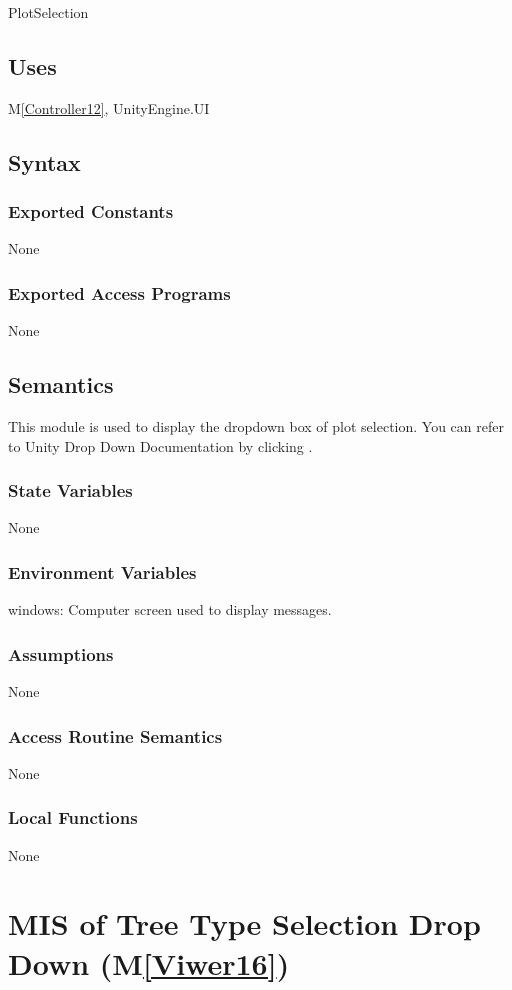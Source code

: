 \documentclass[12pt, titlepage]{article}
\newcommand{\mref}[1]{M\ref{#1}}
\begin{document}
PlotSelection

\subsection{Uses}

\mref{Controller12}, UnityEngine.UI

\subsection{Syntax}

\subsubsection{Exported Constants}
None
\subsubsection{Exported Access Programs}
None

\subsection{Semantics}
This module is used to display the dropdown box of plot 
selection. You can refer to Unity Drop Down Documentation 
by clicking \dref.
\subsubsection{State Variables}
None
\subsubsection{Environment Variables}
windows: Computer screen used to display messages.
\subsubsection{Assumptions}
None
\subsubsection{Access Routine Semantics}
None
\subsubsection{Local Functions}
None

\newpage

\section{MIS of Tree Type Selection Drop Down (\mref{Viwer16})} 
\end{document}
